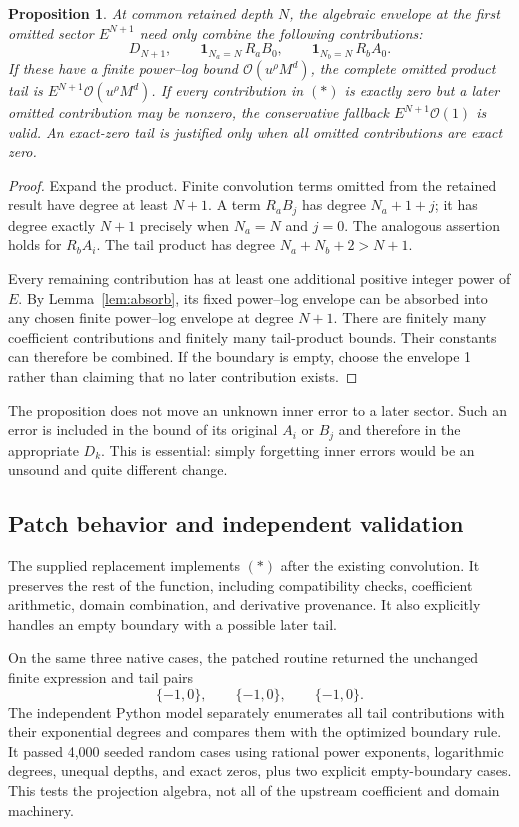 \documentclass[11pt,letterpaper]{article}
\newcommand{\OO}{\mathcal O}
\newtheorem{proposition}{Proposition}[section]
\begin{document}
\begin{proposition}\label{prop:projection}
At common retained depth $N$, the algebraic envelope at the first omitted
sector $E^{N+1}$ need only combine the following contributions:
\[
 D_{N+1},\qquad
 \mathbf 1_{N_a=N}\,R_aB_0,\qquad
 \mathbf 1_{N_b=N}\,R_bA_0.
 \tag{*}
\]
If these have a finite power--log bound $\OO(u^\rho M^d)$, the complete omitted
product tail is $E^{N+1}\OO(u^\rho M^d)$. If every contribution in $(*)$ is
exactly zero but a later omitted contribution may be nonzero, the conservative
fallback $E^{N+1}\OO(1)$ is valid. An exact-zero tail is justified only when all
omitted contributions are exact zero.
\end{proposition}
\begin{proof}
Expand the product. Finite convolution terms omitted from the retained result
have degree at least $N+1$. A term $R_aB_j$ has degree $N_a+1+j$; it has degree
exactly $N+1$ precisely when $N_a=N$ and $j=0$. The analogous assertion holds
for $R_bA_i$. The tail product has degree $N_a+N_b+2>N+1$.

Every remaining contribution has at least one additional positive integer
power of $E$. By Lemma~\ref{lem:absorb}, its fixed power--log envelope can be
absorbed into any chosen finite power--log envelope at degree $N+1$. There
are finitely many coefficient contributions and finitely many tail-product
bounds. Their constants can therefore be combined. If the boundary is empty,
choose the envelope 1 rather than claiming that no later contribution exists.
\end{proof}

The proposition does not move an unknown inner error to a later sector. Such
an error is included in the bound of its original $A_i$ or $B_j$ and therefore
in the appropriate $D_k$. This is essential: simply forgetting inner errors
would be an unsound and quite different change.

\subsection{Patch behavior and independent validation}
The supplied replacement implements $(*)$ after the existing convolution.
It preserves the rest of the function, including compatibility checks,
coefficient arithmetic, domain combination, and derivative provenance. It
also explicitly handles an empty boundary with a possible later tail.

On the same three native cases, the patched routine returned the unchanged
finite expression and tail pairs
\[
 \{-1,0\},\qquad\{-1,0\},\qquad\{-1,0\}.
\]
The independent Python model separately enumerates all tail contributions with
their exponential degrees and compares them with the optimized boundary rule.
It passed 4,000 seeded random cases using rational power exponents, logarithmic
degrees, unequal depths, and exact zeros, plus two explicit empty-boundary
cases. This tests the projection algebra, not all of the upstream coefficient
and domain machinery.
\end{document}
